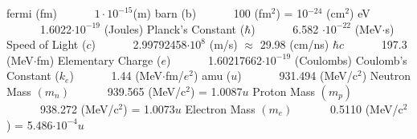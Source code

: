 \noindent
fermi (fm)  \hspace{10pt} \dotfill \ \ \ \ \ \ $1\cdot 10^{-15}$(m) \newline 
barn (b)  \hspace{10pt} \dotfill \ \ \ \ \ \ 100 (fm$^2$) = 10$^{-24}$ (cm$^2$) \newline
eV  \hspace{10pt} \dotfill \ \ \ \ \ \ 1.6022$\cdot 10^{-19}$ (Joules) \newline 
Planck's Constant ($\hbar$)  \hspace{10pt} \dotfill \ \ \ \ \ \ 6.582 $\cdot 10^{-22}$ (MeV$\cdot$s) \newline
Speed of Light ($c$)  \hspace{10pt} \dotfill \ \ \ \ \ \ 2.99792458$\cdot 10^{8}$ (m/s) $\approx$ 29.98 (cm/ns) \newline
$\hbar c$   \hspace{10pt} \dotfill \ \ \ \ \ \ 197.3 (MeV$\cdot$fm) \newline
Elementary Charge ($e$)  \hspace{10pt} \dotfill \ \ \ \ \ \ 1.60217662$\cdot 10^{-19}$ (Coulombs) \newline
Coulomb's Constant ($k_e$)  \hspace{10pt} \dotfill \ \ \ \ \ \ 1.44 (MeV$\cdot$fm/$e^2$) \newline
amu ($u$) \hspace{10pt} \dotfill \ \ \ \ \ \ 931.494 (MeV/c$^2$) \newline
Neutron Mass $(m_n)$ \hspace{10pt} \dotfill \ \ \ \ \ \ 939.565 (MeV/c$^2$) = 1.0087$u$ \newline
Proton Mass $(m_p)$ \hspace{10pt} \dotfill \ \ \ \ \ \ 938.272 (MeV/c$^2$) = 1.0073$u$ \newline
Electron Mass $(m_e)$  \hspace{10pt} \dotfill \ \ \ \ \ \ 0.5110 (MeV/c$^2$) = 5.486$\cdot 10^{-4}u$\newline
